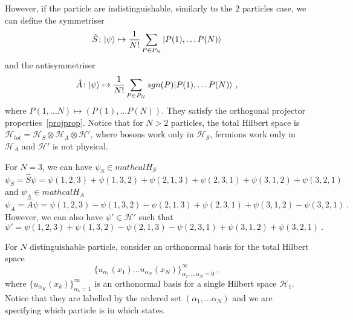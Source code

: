     However, if the particle are indistinguishable, similarly to the $2$ particles case, we can define the symmetriser
    \begin{equation*}
        \hat S \colon \vert\psi\rangle \mapsto \frac{1}{N!} \sum_{P \in P_N} \vert P(1), \ldots P(N)\rangle
    \end{equation*}
    and the antisymmetriser
    \begin{equation*}
        \hat A \colon \vert\psi\rangle \mapsto \frac{1}{N!} \sum_{P \in P_N} sgn(P) \vert P(1), \ldots P(N)\rangle ~,
    \end{equation*}
    where $P(1, \ldots N) \mapsto (P(1), \ldots P(N))$. 
    They satisfy the orthogonal projector properties~\eqref{projprop}. Notice that for $N > 2$ particles, the total Hilbert space is $\mathcal H_{tot} = \mathcal H_S \otimes \mathcal H_A \otimes \mathcal H'$, where bosons work only in $\mathcal H_S$, fermions work only in $\mathcal H_A$ and $\mathcal H'$ is not physical.

    \begin{example}
        For $N=3$, we can have $\psi_S \in mathcal H_S$
        \begin{equation*}
            \psi_S = \hat S \psi = \psi(1,2,3) + \psi(1,3,2) + \psi(2,1,3) + \psi(2,3,1) + \psi(3,1,2) + \psi(3,2,1)
        \end{equation*}
        and $\psi_A \in mathcal H_A$
        \begin{equation*}
            \psi_A = \hat A \psi = \psi(1,2,3) - \psi(1,3,2) - \psi(2,1,3) + \psi(2,3,1) + \psi(3,1,2) - \psi(3,2,1) ~.
        \end{equation*}
        However, we can also have $\psi' \in \mathcal H'$ such that
        \begin{equation*}
            \psi' = \psi(1,2,3) + \psi(1,3,2) -  \psi(2,1,3) - \psi(2,3,1) + \psi(3,1,2) + \psi(3,2,1) ~.
        \end{equation*}
    \end{example}
    
    For $N$ distinguishable particle, consider an orthonormal basis for the total Hilbert space
    \begin{equation*}
        \{u_{\alpha_1}(x_1) \ldots u_{\alpha_N}(x_N)\}_{\alpha_1, \ldots \alpha_N=0}^\infty ~,
    \end{equation*}
    where $\{u_{\alpha_K} (x_k)\}_{\alpha_k = 1}^\infty$ is an orthonormal basis for a single Hilbert space $\mathcal H_1$. Notice that they are labelled by the ordered set $(\alpha_1, \ldots \alpha_N)$ and we are specifying which particle is in which states. 

